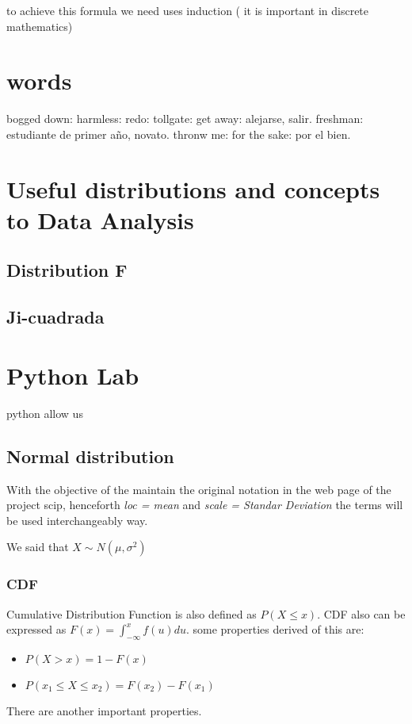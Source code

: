 \documentclass[10pt,a4paper]{article}
\begin{document}
to  achieve this formula we need uses induction ( it is important in discrete mathematics)




\section{words}
bogged down:
harmless:
redo:
tollgate:
get away: alejarse, salir.
freshman: estudiante de primer año, novato.
thronw me:
for the sake: por el bien.



\section{Useful distributions and concepts to Data Analysis}


\subsection{Distribution F}




\subsection{Ji-cuadrada}










\section{Python Lab}


python allow us 



\subsection{Normal distribution}
With the objective of the maintain the original notation in the web page of the project scip,  henceforth \emph{loc = mean} and \emph{scale = Standar Deviation} the terms will be used interchangeably way.

We said that $X \sim N(\mu, \sigma^{2})$


\subsubsection{CDF}
Cumulative Distribution Function is also defined as $P(X \leq x)$.  CDF also can be expressed as $F(x) = \int_{- \infty}^{x}  f(u)du$.
some properties derived of this are:
\begin{itemize}
\item $P(X>x) = 1 - F(x)$
\item $P(x_{1} \leq X \leq x_{2}) = F(x_{2}) - F(x_{1})$ 
\end{itemize}
There are another important properties.
\end{document}
